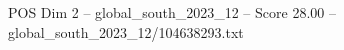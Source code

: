 \begin{textsample}{POS Dim 2 – global\_south\_2023\_12 – Score 28.00 – global\_south\_2023\_12/104638293.txt}
\end{textsample}
